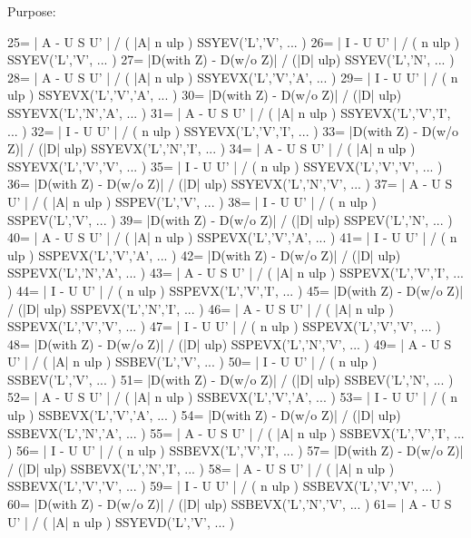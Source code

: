 \begin{DoxyParagraph}{Purpose\+: }
\begin{DoxyVerb}
    25= | A - U S U' | / ( |A| n ulp )        SSYEV('L','V', ... )
    26= | I - U U' | / ( n ulp )              SSYEV('L','V', ... )
    27= |D(with Z) - D(w/o Z)| / (|D| ulp)    SSYEV('L','N', ... )
    28= | A - U S U' | / ( |A| n ulp )        SSYEVX('L','V','A', ... )
    29= | I - U U' | / ( n ulp )              SSYEVX('L','V','A', ... )
    30= |D(with Z) - D(w/o Z)| / (|D| ulp)    SSYEVX('L','N','A', ... )
    31= | A - U S U' | / ( |A| n ulp )        SSYEVX('L','V','I', ... )
    32= | I - U U' | / ( n ulp )              SSYEVX('L','V','I', ... )
    33= |D(with Z) - D(w/o Z)| / (|D| ulp)    SSYEVX('L','N','I', ... )
    34= | A - U S U' | / ( |A| n ulp )        SSYEVX('L','V','V', ... )
    35= | I - U U' | / ( n ulp )              SSYEVX('L','V','V', ... )
    36= |D(with Z) - D(w/o Z)| / (|D| ulp)    SSYEVX('L','N','V', ... )
    37= | A - U S U' | / ( |A| n ulp )        SSPEV('L','V', ... )
    38= | I - U U' | / ( n ulp )              SSPEV('L','V', ... )
    39= |D(with Z) - D(w/o Z)| / (|D| ulp)    SSPEV('L','N', ... )
    40= | A - U S U' | / ( |A| n ulp )        SSPEVX('L','V','A', ... )
    41= | I - U U' | / ( n ulp )              SSPEVX('L','V','A', ... )
    42= |D(with Z) - D(w/o Z)| / (|D| ulp)    SSPEVX('L','N','A', ... )
    43= | A - U S U' | / ( |A| n ulp )        SSPEVX('L','V','I', ... )
    44= | I - U U' | / ( n ulp )              SSPEVX('L','V','I', ... )
    45= |D(with Z) - D(w/o Z)| / (|D| ulp)    SSPEVX('L','N','I', ... )
    46= | A - U S U' | / ( |A| n ulp )        SSPEVX('L','V','V', ... )
    47= | I - U U' | / ( n ulp )              SSPEVX('L','V','V', ... )
    48= |D(with Z) - D(w/o Z)| / (|D| ulp)    SSPEVX('L','N','V', ... )
    49= | A - U S U' | / ( |A| n ulp )        SSBEV('L','V', ... )
    50= | I - U U' | / ( n ulp )              SSBEV('L','V', ... )
    51= |D(with Z) - D(w/o Z)| / (|D| ulp)    SSBEV('L','N', ... )
    52= | A - U S U' | / ( |A| n ulp )        SSBEVX('L','V','A', ... )
    53= | I - U U' | / ( n ulp )              SSBEVX('L','V','A', ... )
    54= |D(with Z) - D(w/o Z)| / (|D| ulp)    SSBEVX('L','N','A', ... )
    55= | A - U S U' | / ( |A| n ulp )        SSBEVX('L','V','I', ... )
    56= | I - U U' | / ( n ulp )              SSBEVX('L','V','I', ... )
    57= |D(with Z) - D(w/o Z)| / (|D| ulp)    SSBEVX('L','N','I', ... )
    58= | A - U S U' | / ( |A| n ulp )        SSBEVX('L','V','V', ... )
    59= | I - U U' | / ( n ulp )              SSBEVX('L','V','V', ... )
    60= |D(with Z) - D(w/o Z)| / (|D| ulp)    SSBEVX('L','N','V', ... )
    61= | A - U S U' | / ( |A| n ulp )        SSYEVD('L','V', ... )

\end{DoxyVerb}
\end{DoxyParagraph}
